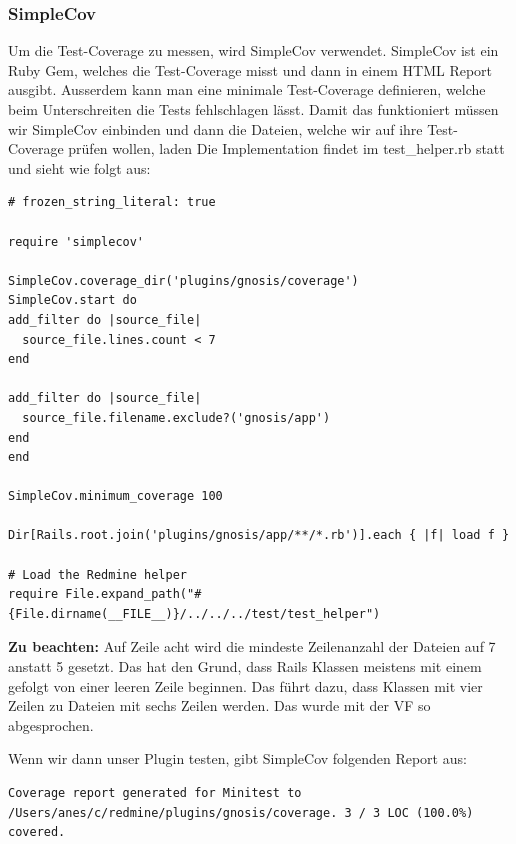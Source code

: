 \subsubsection{SimpleCov}
Um die Test-Coverage zu messen, wird SimpleCov verwendet. SimpleCov ist ein Ruby Gem, welches die Test-Coverage misst und
dann in einem HTML Report ausgibt. Ausserdem kann man eine minimale Test-Coverage definieren, welche beim Unterschreiten
die Tests fehlschlagen lässt. Damit das funktioniert müssen wir SimpleCov einbinden und dann die Dateien, welche wir
auf ihre Test-Coverage prüfen wollen, laden\newline
Die Implementation findet im test\_helper.rb statt und sieht wie folgt aus:
\begin{codebox}[]
  \begin{verbatim}
# frozen_string_literal: true

require 'simplecov'

SimpleCov.coverage_dir('plugins/gnosis/coverage')
SimpleCov.start do
add_filter do |source_file|
  source_file.lines.count < 7
end

add_filter do |source_file|
  source_file.filename.exclude?('gnosis/app')
end
end

SimpleCov.minimum_coverage 100

Dir[Rails.root.join('plugins/gnosis/app/**/*.rb')].each { |f| load f }

# Load the Redmine helper
require File.expand_path("#{File.dirname(__FILE__)}/../../../test/test_helper")
  \end{verbatim}
\end{codebox}
\textbf{Zu beachten:} Auf Zeile acht wird die mindeste Zeilenanzahl der Dateien auf 7 anstatt 5 gesetzt. Das hat den
Grund, dass Rails Klassen meistens mit einem  gefolgt von einer
leeren Zeile beginnen. Das führt dazu, dass Klassen mit vier Zeilen zu Dateien mit sechs Zeilen werden. Das wurde mit
der VF so abgesprochen. \newline

Wenn wir dann unser Plugin testen, gibt SimpleCov folgenden Report aus:
\begin{codebox}
  \begin{verbatim}
Coverage report generated for Minitest to /Users/anes/c/redmine/plugins/gnosis/coverage. 3 / 3 LOC (100.0%) covered.
  \end{verbatim}
\end{codebox}

